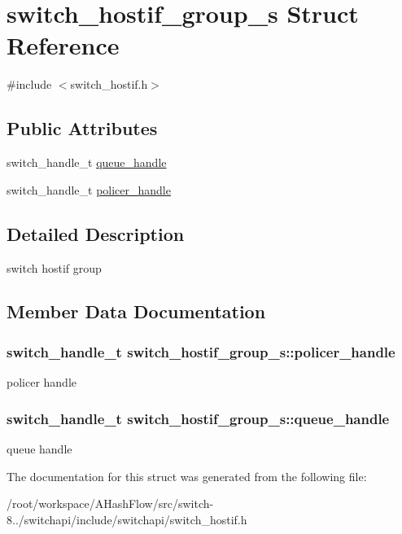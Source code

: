 \hypertarget{structswitch__hostif__group__s}{\section{switch\+\_\+hostif\+\_\+group\+\_\+s Struct Reference}
\label{structswitch__hostif__group__s}
}


{\ttfamily \#include $<$switch\+\_\+hostif.\+h$>$}

\subsection*{Public Attributes}
\begin{DoxyCompactItemize}
\item 
switch\+\_\+handle\+\_\+t \hyperlink{structswitch__hostif__group__s_a9ae28c33b1eb456b4541762eda2582c5}{queue\+\_\+handle}
\item 
switch\+\_\+handle\+\_\+t \hyperlink{structswitch__hostif__group__s_a3bf828fcfed0971db292544e0523a08f}{policer\+\_\+handle}
\end{DoxyCompactItemize}


\subsection{Detailed Description}
switch hostif group 

\subsection{Member Data Documentation}
\hypertarget{structswitch__hostif__group__s_a3bf828fcfed0971db292544e0523a08f}{
\subsubsection[{policer\+\_\+handle}]{\setlength{\rightskip}{0pt plus 5cm}switch\+\_\+handle\+\_\+t switch\+\_\+hostif\+\_\+group\+\_\+s\+::policer\+\_\+handle}}\label{structswitch__hostif__group__s_a3bf828fcfed0971db292544e0523a08f}
policer handle \hypertarget{structswitch__hostif__group__s_a9ae28c33b1eb456b4541762eda2582c5}{
\subsubsection[{queue\+\_\+handle}]{\setlength{\rightskip}{0pt plus 5cm}switch\+\_\+handle\+\_\+t switch\+\_\+hostif\+\_\+group\+\_\+s\+::queue\+\_\+handle}}\label{structswitch__hostif__group__s_a9ae28c33b1eb456b4541762eda2582c5}
queue handle 

The documentation for this struct was generated from the following file\+:\begin{DoxyCompactItemize}
\item 
/root/workspace/\+A\+Hash\+Flow/src/switch-\/8../switchapi/include/switchapi/switch\+\_\+hostif.\+h\end{DoxyCompactItemize}

